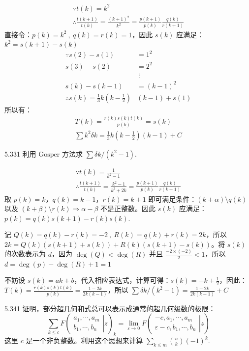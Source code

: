 \begin{gather*}
  \because t(k) = k^2 \\
  \therefore \frac{t(k+1)}{t(k)} = \frac{(k+1)^2}{k^2} = \frac{p(k+1)}{p(k)} \frac{q(k)}{r(k+1)}
\end{gather*}
直接令：\( p(k) = k^2 \ , \ q(k) = r(k) = 1 \)，因此 \( s(k) \) 应满足：\( k^2 = s(k+1) - s(k) \)
\begin{align*}
  \because s(2) - s(1) &= 1^2 \\
  s(3) - s(2) &= 2^2 \\
  & \ \vdots \\
  s(k) - s(k-1) &= (k-1)^2 \\
  \therefore s(k) = \frac{1}{3} k (k-\frac{1}{2}) & (k-1) + s(1)
\end{align*}
所以有：
\begin{gather*}
  T(k) = \frac{r(k) s(k) t(k)}{p(k)} = s(k) \\
  \sum k^2 \delta k = \frac{1}{3} k (k-\frac{1}{2}) (k-1) + C
\end{gather*}

\begin{problem}{5.33}{1}
  利用 \( \text{Gosper} \) 方法求 \( \sum \delta k / (k^2 - 1) \).
\end{problem}

\begin{gather*}
  \because t(k) = \frac{1}{k^2 - 1} \\
  \therefore \frac{t(k+1)}{t(k)} = \frac{k^2 - 1}{k^2 + 2k} = \frac{p(k+1)}{p(k)} \frac{q(k)}{r(k+1)}
\end{gather*}
取 \( p(k) = k \)，\( q(k) = k-1 \)，\( r(k) = k+1 \) 即可满足条件：\( (k+\alpha) \setminus q(k) \) 以及 \( (k+\beta) \setminus r(k) \Rightarrow \alpha - \beta \) 不是正整数。因此 \( s(k) \) 应满足：\( p(k) = q(k) s(k+1) - r(k) s(k) \).

记 \( Q(k) = q(k) - r(k) = -2 \ , \ R(k) = q(k) + r(k) = 2k \)，所以 \( 2k = Q(k) (s(k+1) + s(k)) + R(k) (s(k+1) - s(k)) \)。将 \( s(k) \) 的次数表示为 \( d \)，因为 \( \deg{(Q)} < \deg{(R)} \) 并且 \( \frac{-2 \times (-2)}{2} < 1 \)，所以 \( d = \deg{(p)} - \deg{(R)} + 1 = 1 \)

不妨设 \( s(k) = ak + b \)，代入相应表达式，计算可得：\( s(k) = -k + \frac{1}{2} \)，因此：\( T(k) = \frac{r(k) s(k) t(k)}{p(k)} = \frac{1-2k}{2k(k-1)} \)，所以 \( \sum \delta k / (k^2 - 1) = \frac{1-2k}{2k(k-1)} + C \)

\begin{problem}{5.34}{1}
  证明，部分超几何和式总可以表示成通常的超几何级数的极限：
  \[
    \sum_{k \le c} F
    \left( \left.
      \begin{array}{cccc}
        a_1, \cdots, a_m \\
        b_1, \cdots, b_n
    \end{array} \right|{z} \right)_k = \lim_{\varepsilon \to 0} F
    \left( \left.
      \begin{array}{cccc}
        -c, a_1, \cdots, a_m \\
        \varepsilon - c, b_1, \cdots, b_n
    \end{array} \right|{z} \right)
  \]
  这里 \( c \) 是一个非负整数。利用这个思想来计算 \( \sum_{k \le m} \binom{n}{k} (-1)^k \).
\end{problem}

